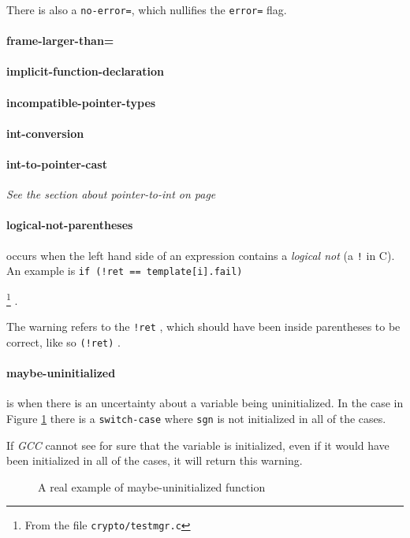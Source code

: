 \documentclass[a4paper,11pt]{report}
\newcommand{\textcode}[1]{
    \fboxsep=1pt
    \texttt{\colorbox{gray!20}{#1}}
}
\newcommand{\figa}{
    \begin{figure}[!htpb]
    \centering
}
\newcommand{\figb}[2]{
    \caption{#1}
    \label{#2}
    \end{figure}
}
\begin{document}
There is also a \texttt{no-error=}, which nullifies the \texttt{error=} flag.


            \paragraph{frame-larger-than=}
            \paragraph{implicit-function-declaration}
            \paragraph{incompatible-pointer-types}
            \paragraph{int-conversion}
            \paragraph{int-to-pointer-cast}
\emph{See the section about pointer-to-int on page \pageref{par:pointertoint}}

            \paragraph{logical-not-parentheses}
occurs when the left hand side of an expression contains a \emph{logical not} 
(a \texttt{!} in C). An example is \textcode{if (!ret == template[i].fail)}
    \footnote{From the file \texttt{crypto/testmgr.c}}
.

The warning refers to the \textcode{!ret}, which should have been inside 
parentheses to be correct, like so \textcode{(!ret)}.


            \paragraph{maybe-uninitialized}
is when there is an uncertainty about a variable being uninitialized. In the 
case in Figure \ref{lst:maybeuninitializedreal} there is a 
\texttt{switch-case} where \texttt{sgn} is not initialized in all of the cases.

If \emph{GCC} cannot see for sure that the variable is initialized, 
even if it would have been initialized in all of the cases, it will return this 
warning.

\figa
    
\figb{A real example of maybe-uninitialized function}{lst:maybeuninitializedreal}
\end{document}
